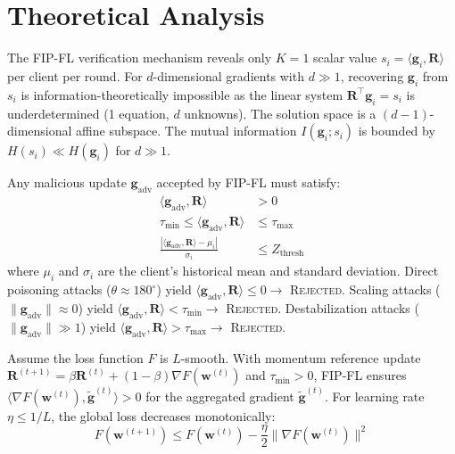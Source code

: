 \documentclass[10pt,journal,compsoc]{IEEEtran}
\begin{document}
\section{Theoretical Analysis}
\label{sec:theory}

\begin{theorem}
\label{thm:privacy}
The FIP-FL verification mechanism reveals only $K = 1$ scalar value 
$s_i = \langle \mathbf{g}_i, \mathbf{R} \rangle$ per client per round.
For $d$-dimensional gradients with $d \gg 1$, recovering $\mathbf{g}_i$ from $s_i$ 
is information-theoretically impossible as the linear system
$\mathbf{R}^\top \mathbf{g}_i = s_i$ is underdetermined 
(1 equation, $d$ unknowns). The solution space is a $(d-1)$-dimensional 
affine subspace. The mutual information $I(\mathbf{g}_i; s_i)$ is bounded by
$H(s_i) \ll H(\mathbf{g}_i)$ for $d \gg 1$.
\end{theorem}

\begin{theorem}
\label{thm:security}
Any malicious update $\mathbf{g}_{\text{adv}}$ accepted by FIP-FL must satisfy:
\begin{align}
    \langle \mathbf{g}_{\text{adv}}, \mathbf{R} \rangle &> 0 \tag{Direction constraint} \\
    \tau_{\min} \leq \langle \mathbf{g}_{\text{adv}}, \mathbf{R} \rangle &\leq \tau_{\max} \tag{Magnitude constraint} \\
    \frac{|\langle \mathbf{g}_{\text{adv}}, \mathbf{R} \rangle - \mu_i|}{\sigma_i} &\leq Z_{\text{thresh}} \tag{Consistency constraint}
\end{align}
where $\mu_i$ and $\sigma_i$ are the client's historical mean and standard deviation.
Direct poisoning attacks ($\theta \approx 180^\circ$) yield $\langle \mathbf{g}_{\text{adv}}, \mathbf{R} \rangle \leq 0 \rightarrow$ \textsc{Rejected}.
Scaling attacks ($\|\mathbf{g}_{\text{adv}}\| \approx 0$) yield $\langle \mathbf{g}_{\text{adv}}, \mathbf{R} \rangle < \tau_{\min} \rightarrow$ \textsc{Rejected}.
Destabilization attacks ($\|\mathbf{g}_{\text{adv}}\| \gg 1$) yield $\langle \mathbf{g}_{\text{adv}}, \mathbf{R} \rangle > \tau_{\max} \rightarrow$ \textsc{Rejected}.
\end{theorem}

\begin{theorem}
\label{thm:convergence}
Assume the loss function $F$ is $L$-smooth. With momentum reference update
$\mathbf{R}^{(t+1)} = \beta \mathbf{R}^{(t)} + (1-\beta) \nabla F(\mathbf{w}^{(t)})$
and $\tau_{\min} > 0$, FIP-FL ensures $\langle \nabla F(\mathbf{w}^{(t)}), \tilde{\mathbf{g}}^{(t)} \rangle > 0$
for the aggregated gradient $\tilde{\mathbf{g}}^{(t)}$. For learning rate $\eta \leq 1/L$,
the global loss decreases monotonically:
\begin{equation}
    F(\mathbf{w}^{(t+1)}) \leq F(\mathbf{w}^{(t)}) - \frac{\eta}{2} \|\nabla F(\mathbf{w}^{(t)})\|^2
\end{equation}
\end{theorem}
\end{document}
